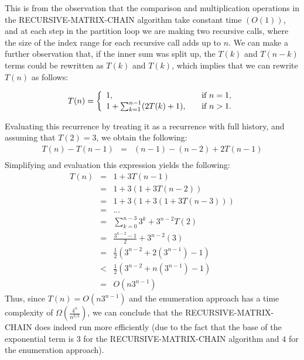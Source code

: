 \documentclass[11pt]{article}
\begin{document}
\begin{sol}
This is from the observation that the comparison and multiplication operations in the RECURSIVE-MATRIX-CHAIN algorithm take constant time $(O(1))$, and at each step in the partition loop we are making two recursive calls, where the size of the index range for each recursive call adds up to $n$. We can make a further observation that, if the inner sum was split up, the $T(k)$ and $T(n-k)$ terms could be rewritten as $T(k)$ and $T(k)$, which implies that we can rewrite $T(n)$ as follows:

\[
T(n) = \left\{ 
  \begin{array}{l l}
    1, & \quad \text{if $n = 1$}, \\
    1 + \sum_{k=1}^{n-1}(2T(k) + 1), & \quad \text{if $n > 1$}. \\
  \end{array} \right.
\]

Evaluating this recurrence by treating it as a recurrence with full history, and assuming that $T(2) = 3$, we obtain the following:
\begin{eqnarray*}
T(n) - T(n - 1) & = & (n - 1) - (n - 2) + 2T(n-1) \\
\end{eqnarray*}
Simplifying and evaluation this expression yields the following:
\begin{eqnarray*}
T(n) & = & 1 + 3T(n-1) \\
& = & 1 + 3(1 + 3T(n-2)) \\
& = & 1 + 3(1 + 3(1 + 3T(n-3))) \\
& = & ... \\
& = & \sum_{k=0}^{n-3}3^k + 3^{n-2}T(2) \\
& = & \frac{3^{n-2} - 1}{2} + 3^{n-2}(3) \\
& = & \frac{1}{2}(3^{n-2} + 2(3^{n-1}) - 1) \\
& < & \frac{1}{2}(3^{n-2} + n(3^{n-1}) - 1) \\
& = & O(n3^{n-1})
\end{eqnarray*}
Thus, since $T(n) = O(n3^{n-1})$ and the enumeration approach has a time complexity of $\Omega(\frac{4^n}{n^{3/2}})$, we can conclude that the RECURSIVE-MATRIX-CHAIN does indeed run more efficiently (due to the fact that the base of the exponential term is $3$ for the RECURSIVE-MATRIX-CHAIN algorithm and $4$ for the enumeration approach). 
\end{sol}
\end{document}
